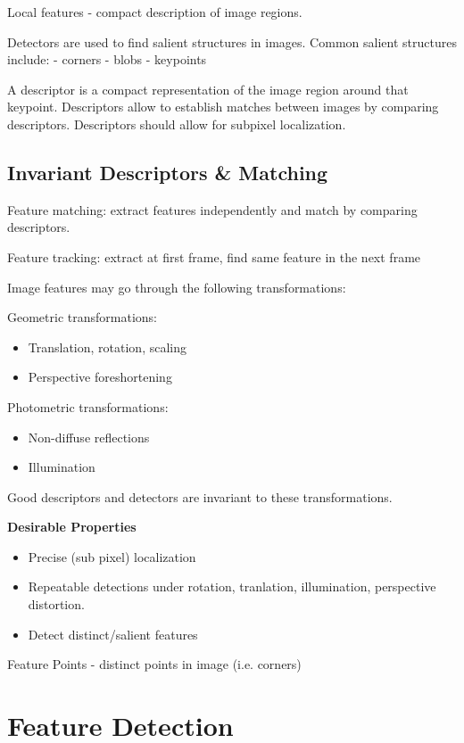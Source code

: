 Local features - compact description of image regions.

Detectors are used to find salient structures in images. Common salient structures include:
- corners
- blobs
- keypoints

A descriptor is a compact representation of the image region around that keypoint.
Descriptors allow to establish matches between images by comparing descriptors.
Descriptors should allow for subpixel localization.

\subsection{ Invariant Descriptors \& Matching}

Feature matching: extract features independently and match by comparing descriptors.

Feature tracking: extract at first frame, find same feature in the next frame

Image features may go through the following transformations:

Geometric transformations:
\begin{itemize}
\item Translation, rotation, scaling
\item Perspective foreshortening 
\end{itemize}

Photometric transformations:
\begin{itemize}
\item Non-diffuse reflections 
\item Illumination
\end{itemize}

Good descriptors and detectors are invariant to these transformations. 

\textbf{Desirable Properties}
\begin{itemize} 
\item Precise (sub pixel) localization
\item Repeatable detections under rotation, tranlation, illumination, perspective distortion.
\item Detect distinct/salient features
\end{itemize}

Feature Points - distinct points in image (i.e. corners)

\section{Feature Detection}

